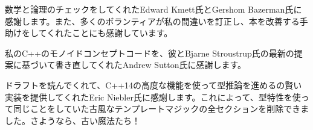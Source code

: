 \noindent
数学と論理のチェックをしてくれたEdward Kmett氏とGershom Bazerman氏に感謝します。また、多くのボランティアが私の間違いを訂正し、本を改善する手助けをしてくれたことにも感謝しています。

\vspace{1.0em}
\noindent
私のC++のモノイドコンセプトコードを、彼とBjarne Stroustrup氏の最新の提案に基づいて書き直してくれたAndrew Sutton氏に感謝します。

\vspace{1.0em}
\noindent
ドラフトを読んでくれて、C++14の高度な機能を使って型推論を進めるの賢い実装を提供してくれたEric Niebler氏に感謝します。これによって、型特性を使って同じことをしていた古風なテンプレートマジックの全セクションを削除できました。さようなら、古い魔法たち！
